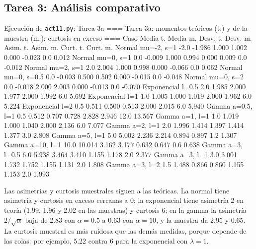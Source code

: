 \documentclass[11pt,letterpaper]{article}
\begin{document}
\subsection{Tarea 3: Análisis comparativo}

\begin{consola}[label=out:t3a]{Ejecución de \texttt{act11.py}: Tarea 3a}
=== Tarea 3a: momentos teóricos (t.) y de la muestra (m.); curtosis en exceso ===
              Caso  Media t.  Media m.  Desv. t.  Desv. m.  Asim. t.  Asim. m.  Curt. t.  Curt. m.
 Normal mu=-2, s=1      -2.0    -1.986     1.000     1.002     0.000    -0.023       0.0     0.012
  Normal mu=0, s=1       0.0    -0.009     1.000     0.994     0.000     0.009       0.0    -0.012
  Normal mu=2, s=1       2.0     2.004     1.000     0.998     0.000    -0.066       0.0     0.062
Normal mu=0, s=0.5       0.0    -0.003     0.500     0.502     0.000    -0.015       0.0    -0.048
  Normal mu=0, s=2       0.0    -0.018     2.000     2.003     0.000    -0.013       0.0    -0.070
 Exponencial l=0.5       2.0     1.985     2.000     1.977     2.000     1.992       6.0     5.692
   Exponencial l=1       1.0     1.005     1.000     1.019     2.000     1.962       6.0     5.224
   Exponencial l=2       0.5     0.511     0.500     0.513     2.000     2.015       6.0     5.940
  Gamma a=0.5, l=1       0.5     0.512     0.707     0.728     2.828     2.946      12.0    13.567
    Gamma a=1, l=1       1.0     1.019     1.000     1.040     2.000     2.136       6.0     7.077
    Gamma a=2, l=1       2.0     1.996     1.414     1.397     1.414     1.377       3.0     2.808
    Gamma a=5, l=1       5.0     5.002     2.236     2.214     0.894     0.897       1.2     1.307
   Gamma a=10, l=1      10.0    10.014     3.162     3.177     0.632     0.647       0.6     0.638
  Gamma a=3, l=0.5       6.0     5.938     3.464     3.410     1.155     1.178       2.0     2.377
    Gamma a=3, l=1       3.0     3.001     1.732     1.752     1.155     1.131       2.0     1.808
    Gamma a=3, l=2       1.5     1.488     0.866     0.860     1.155     1.153       2.0     1.993
\end{consola}

Las asimetrías y curtosis muestrales siguen a las teóricas. La normal tiene asimetría y curtosis en exceso cercanas a 0; la exponencial tiene asimetría 2 en teoría (1.99, 1.96 y 2.02 en las muestras) y curtosis 6; en la gamma la asimetría $2/\sqrt{\alpha}$ baja de 2.83 con $\alpha = 0.5$ a 0.63 con $\alpha = 10$, y la muestra da 2.95 y 0.65. La curtosis muestral es más ruidosa que las demás medidas, porque depende de las colas: por ejemplo, 5.22 contra 6 para la exponencial con $\lambda = 1$.
\end{document}
